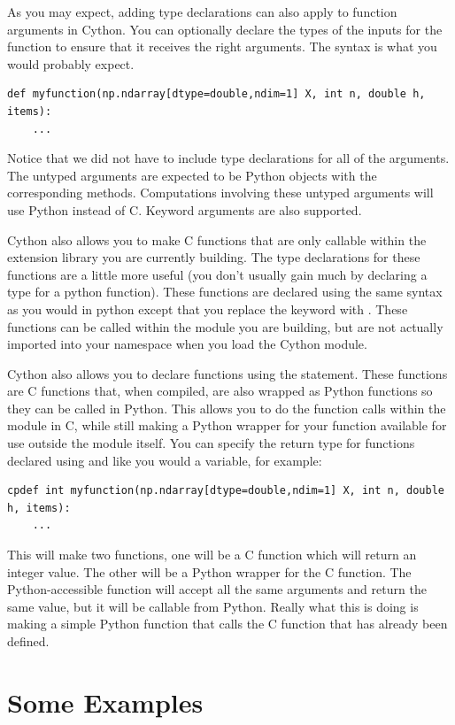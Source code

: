 As you may expect, adding type declarations can also apply to function arguments in Cython.
You can optionally declare the types of the inputs for the function to ensure that it receives the right arguments.
The syntax is what you would probably expect.
\begin{lstlisting}
def myfunction(np.ndarray[dtype=double,ndim=1] X, int n, double h, items):
    ...
\end{lstlisting}
Notice that we did not have to include type declarations for all of the arguments.
The untyped arguments are expected to be Python objects with the corresponding methods. Computations involving these untyped arguments will use Python instead of C.
Keyword arguments are also supported.

Cython also allows you to make C functions that are only callable within the extension library you are currently building.
The type declarations for these functions are a little more useful (you don't usually gain much by declaring a type for a python function).
These functions are declared using the same syntax as you would in python except that you replace the keyword  with .
These functions can be called within the module you are building, but are not actually imported into your namespace when you load the Cython module.

Cython also allows you to declare functions using the  statement.
These functions are C functions that, when compiled, are also wrapped as Python functions so they can be called in Python.
This allows you to do the function calls within the module in C, while still making a Python wrapper for your function available for use outside the module itself.
You can specify the return type for functions declared using  and  like you would a variable, for example:
\begin{lstlisting}
cpdef int myfunction(np.ndarray[dtype=double,ndim=1] X, int n, double h, items):
    ...
\end{lstlisting}
This will make two functions, one will be a C function which will return an integer value.
The other will be a Python wrapper for the C function.
The Python-accessible function will accept all the same arguments and return the same value, but it will be callable from Python.
Really what this is doing is making a simple Python function that calls the C function that has already been defined.

\section*{Some Examples}

